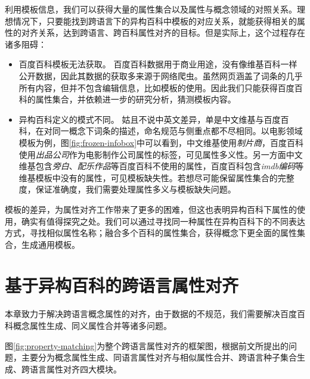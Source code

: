 利用模板信息，我们可以获得大量的属性集合以及属性与概念领域的对照关系。理想情况下，只要能找到跨语言下的异构百科中模板的对应关系，就能获得相关的属性的对齐关系，达到跨语言、跨百科属性对齐的目标。但是实际上，这个过程存在诸多阻碍：
\begin{itemize}
\item {\heiti 百度百科模板无法获取。} 百度百科数据用于商业用途，没有像维基百科一样公开数据，因此其数据的获取多来源于网络爬虫。虽然网页涵盖了词条的几乎所有内容，但并不包含编辑信息，比如模板的使用。因此我们只能获得百度百科的属性集合，并依赖进一步的研究分析，猜测模板内容。
\item {\heiti 异构百科定义的模式不同。} 姑且不说中英文差异，单是中文维基与百度百科，在对同一概念下词条的描述，命名规范与侧重点都不尽相同。以电影领域模板为例，图\ref{fig:frozen-infobox}中可以看到，中文维基使用\textit{制片商}，百度百科使用\textit{出品公司}作为电影制作公司属性的标签，可见{\heiti 属性多义性}。另一方面中文维基包含\textit{旁白}、\textit{配乐作品}等百度百科不使用的属性，百度百科包含\textit{imdb编码}等维基模板中没有的属性，可见{\heiti 模板缺失性}。若想尽可能保留属性集合的完整度，保证准确度，我们需要处理属性多义与模板缺失问题。
\end{itemize}

模板的差异，为属性对齐工作带来了更多的困难，但这也表明异构百科下属性的使用，确实有值得探究之处。我们可以通过寻找同一种属性在异构百科下的不同表达方式，寻找相似属性名称；融合多个百科的属性集合，获得概念下更全面的属性集合，生成通用模板。

\section{基于异构百科的跨语言属性对齐}
\label{sec:property-matching}

本章致力于解决跨语言概念属性的对齐，由于数据的不规范，我们需要解决百度百科概念属性生成、同义属性合并等诸多问题。


图\ref{fig:property-matching}为整个跨语言属性对齐的框架图，根据前文所提出的问题，主要分为概念属性生成、同语言属性对齐与相似属性合并、跨语言种子集合生成、跨语言属性对齐四大模块。

